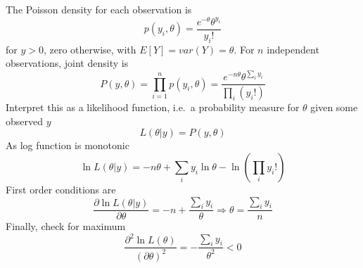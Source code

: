 \documentclass[
  letterpaper,
]{book}
\begin{document}
The Poisson density for each observation is \begin{equation}
   p(y_i, \theta) = \frac{e^{-\theta} \theta^{y_i}}{y_i!}
\end{equation} for \(y>0\), zero otherwise, with \(E[Y]=var(Y)=\theta\).
For \(n\) independent observations, joint density is \begin{equation}
P(y, \theta) = \prod_{i=1}^n p(y_i, \theta)
  = \frac{e^{-n\theta}\theta^{\sum_i y_i}}{\prod_i (y_i!)}
\end{equation} Interpret this as a likelihood function, i.e.~a
probability measure for \(\theta\) given some observed \(y\)
\begin{equation}
 L(\theta | y) = P(y,\theta)
\end{equation} As log function is monotonic \begin{equation}
\ln L(\theta | y) = -n\theta + {\textstyle{\sum_i} y_i} \ln\theta  - \ln\left(\textstyle{\prod_i} y_i! \right)
\end{equation} First order conditions are \begin{equation}
  \frac{\partial \ln L(\theta|y)}{\partial\theta}
     = -n + \frac{\sum_i y_i}{\theta}
     \Rightarrow
        \theta =\frac{\sum_i y_i}{n}
\end{equation} Finally, check for maximum \begin{equation}
 \frac{\partial^2\ln L(\theta)}{(\partial\theta)^2} = -\frac{\sum_i y_i}{\theta^2} < 0
\end{equation}
\end{document}
